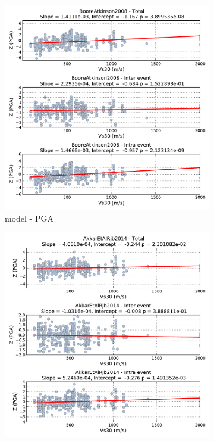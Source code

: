 \begin{figure}[htb]
  \centering
  \begin{subfigure}[b]{0.49\textwidth}
      \includegraphics[width=\textwidth]{./figures/residuals/BA2008_Vs30_PGA.pdf}
      \caption{\textcite{boore2008} model - PGA}
      \label{fig:pga_vs30_ba2008}
  \end{subfigure}
    \begin{subfigure}[b]{0.49\textwidth}
      \includegraphics[width=\textwidth]{./figures/residuals/Akkar2014_Vs30_PGA.pdf}

\end{subfigure}
\end{figure}
